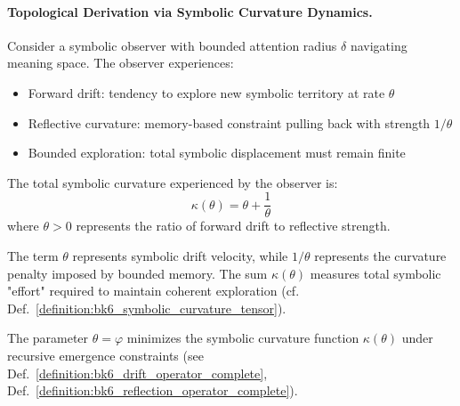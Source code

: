 \paragraph{Topological Derivation via Symbolic Curvature Dynamics.}
\label{paragraph:appC_topological_derivation_symbolic_curvature}

\begin{definition}
\label{def:appC_bounded_symbolic_observer_dynamics}
Consider a symbolic observer with bounded attention radius $\delta$ navigating meaning space. The observer experiences:
\begin{itemize}
\item Forward drift: tendency to explore new symbolic territory at rate $\theta$
\item Reflective curvature: memory-based constraint pulling back with strength $1/\theta$
\item Bounded exploration: total symbolic displacement must remain finite
\end{itemize}
\end{definition}

\begin{definition}
\label{def:appC_symbolic_curvature_function}
The total symbolic curvature experienced by the observer is:
\[
\kappa(\theta) = \theta + \frac{1}{\theta}
\]
where $\theta > 0$ represents the ratio of forward drift to reflective strength.
\end{definition}

\begin{lemma}
\label{lem:appC_geometric_interpretation_curvature}
The term $\theta$ represents symbolic drift velocity, while $1/\theta$ represents the curvature penalty imposed by bounded memory. The sum $\kappa(\theta)$ measures total symbolic "effort" required to maintain coherent exploration (cf. Def.~\ref{definition:bk6_symbolic_curvature_tensor}).
\end{lemma}

\begin{theorem}
\label{theorem:appC_phi_minimal_curvature_parameter}
The parameter $\theta = \varphi$ minimizes the symbolic curvature function $\kappa(\theta)$ under recursive emergence constraints (see Def.~\ref{definition:bk6_drift_operator_complete}, Def.~\ref{definition:bk6_reflection_operator_complete}).
\end{theorem}

